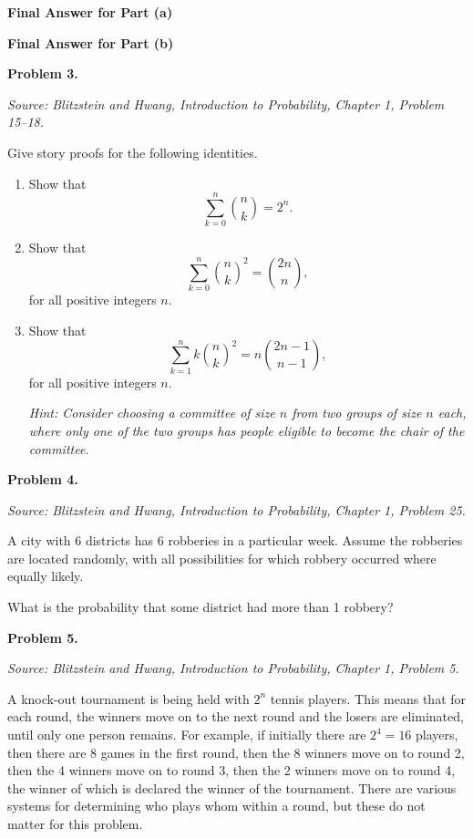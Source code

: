 \documentclass[11pt]{article}
\newcommand{\source}[1]{%
    \vspace{0.15cm}
    {\small\textit{Source: Blitzstein and Hwang, \textit{Introduction to Probability}, Chapter 1, Problem #1.}}
}
\newcommand{\partanswerbox}[1]{%
\begin{flushright}
\begin{tcolorbox}[
    width=0.36\textwidth,
    height=2cm,
    colback=white,
    colframe=uwpurple,
    boxrule=0.7pt,
    arc=1mm
]
{\small\textbf{Final Answer for Part #1}}
\end{tcolorbox}
\end{flushright}
}
\begin{document}
\vfill
\partanswerbox{(a)}
\partanswerbox{(b)}
\newpage


\begin{problemheader}
\textbf{Problem 3.} \hfill  
\end{problemheader}
\source{15--18}

Give story proofs for the following identities.

\begin{enumerate}[label=(\alph*), leftmargin=*]
    \item Show that
    \[
    \sum_{k=0}^{n} {n \choose k}=2^n.
    \]
    

    \item Show that
    \[
    \sum_{k=0}^{n}{n \choose k}^2={2n \choose n},
    \]
    for all positive integers $n$.

    \item Show that
    \[
    \sum_{k=1}^{n} k{n \choose k}^2
    =
    n{2n-1 \choose n-1},
    \]
    for all positive integers $n$.

    \emph{Hint: Consider choosing a committee of size $n$ from two groups of size $n$ each, where only one of the two groups has people eligible to become the chair of the committee.}
\end{enumerate}

\vfill


\newpage


\begin{problemheader}
\textbf{Problem 4. } \hfill 
\end{problemheader}
\source{25}

A city with 6 districts has 6 robberies in a particular week. Assume the robberies are located randomly, with all possibilities for which robbery occurred where equally likely.

What is the probability that some district had more than 1 robbery?

\vfill


\newpage


\begin{problemheader}
\textbf{Problem 5. } \hfill  
\end{problemheader}
\source{5}

A knock-out tournament is being held with $2^n$ tennis players. This means that for each round, the winners move on to the next round and the losers are eliminated, until only one person remains. For example, if initially there are $2^4=16$ players, then there are 8 games in the first round, then the 8 winners move on to round 2, then the 4 winners move on to round 3, then the 2 winners move on to round 4, the winner of which is declared the winner of the tournament. There are various systems for determining who plays whom within a round, but these do not matter for this problem.
\end{document}
